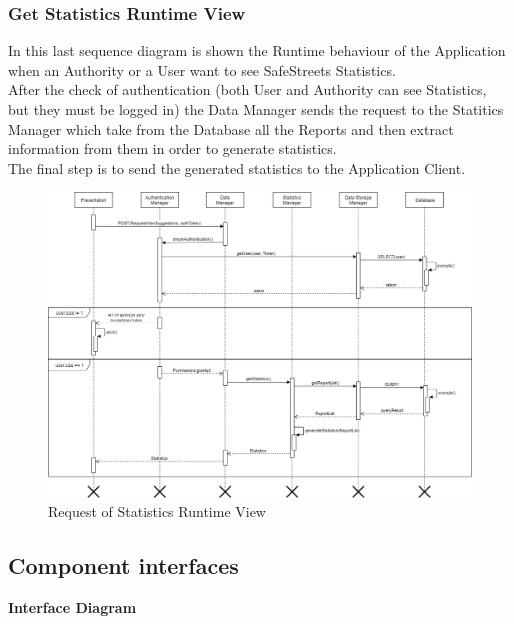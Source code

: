 \subsubsection{Get Statistics Runtime View}
In this last sequence diagram is shown the Runtime behaviour of the Application when an Authority or a User want to see SafeStreets Statistics.\\
After the check of authentication (both User and Authority can see Statistics, but they must be logged in) the Data Manager sends the request to the Statitics Manager which take from the Database all the Reports and then extract information from them in order to generate statistics.\\
The final step is to send the generated statistics to the Application Client.
\begin{figure}[H]
          \includegraphics[scale=0.35]{Images/Seq_viewStatistics.png}
        \caption{Request of Statistics Runtime View}
\end{figure}
\newpage
\subsection{Component interfaces}
\textbf{Interface Diagram} 

